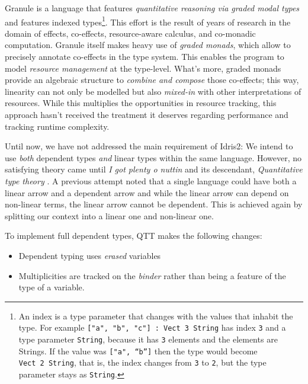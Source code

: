 \documentclass[
]{article}
\providecommand{\tightlist}{%
  \setlength{\itemsep}{0pt}\setlength{\parskip}{0pt}}
\begin{document}
Granule is a language that features \emph{quantitative reasoning via
graded modal types} and features indexed types\footnote{An index is a
  type parameter that changes with the values that inhabit the type. For
  example \texttt{{[}"a",\ "b",\ "c"{]}\ :\ Vect\ 3\ String} has index
  \texttt{3} and a type parameter \texttt{String}, because it has
  \texttt{3} elements and the elements are Strings. If the value was
  \texttt{{[}\textasciigrave{}"a",\ “b”{]}} then the type would become
  \texttt{Vect\ 2\ String}, that is, the index changes from \texttt{3}
  to \texttt{2}, but the type parameter stays as \texttt{String}.}. This
effort is the result of years of research in the domain of effects,
co-effects, resource-aware calculus, and co-monadic
computation\cite{monad_or_comonad}. Granule itself makes heavy use of
\emph{graded monads}\cite{effect_coeffects_grading}, which allow to
precisely annotate co-effects\cite{coeffect_computation} in the type
system. This enables the program to model \emph{resource management} at
the type-level. What's more, graded monads provide an algebraic
structure to \emph{combine and compose} those
co-effects\cite{quantitative_coeffects}; this way, linearity can not
only be modelled but also \emph{mixed-in} with other interpretations of
resources. While this multiplies the opportunities in resource tracking,
this approach hasn't received the treatment it deserves regarding
performance and tracking runtime complexity.

Until now, we have not addressed the main requirement of Idris2: We
intend to use \emph{both} dependent types \emph{and} linear types within
the same language. However, no satisfying theory came until \emph{I got
plenty o nuttin}\cite{nuttin} and its descendant, \emph{Quantitative
type theory} \cite{qtt}. A previous
attempt\cite{integrating_linear_dependent} noted that a single language
could have both a linear arrow and a dependent arrow and while the
linear arrow can depend on non-linear terms, the linear arrow cannot be
dependent. This is achieved again by splitting our context into a linear
one and non-linear one.

To implement full dependent types, QTT makes the following changes:

\begin{itemize}
\tightlist
\item
  Dependent typing uses \emph{erased} variables
\item
  Multiplicities are tracked on the \emph{binder} rather than being a
  feature of the type of a variable.
\end{itemize}
\end{document}

